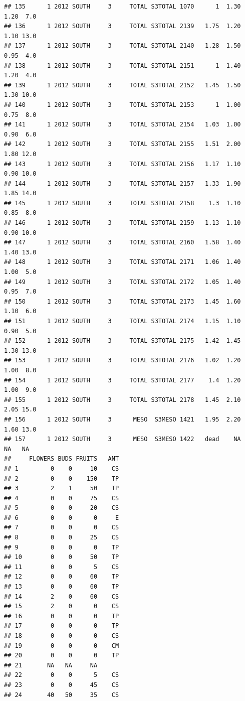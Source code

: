 \documentclass[
]{article}
\begin{document}
\begin{verbatim}
## 135      1 2012 SOUTH     3     TOTAL S3TOTAL 1070      1  1.30  1.20  7.0
## 136      1 2012 SOUTH     3     TOTAL S3TOTAL 2139   1.75  1.20  1.10 13.0
## 137      1 2012 SOUTH     3     TOTAL S3TOTAL 2140   1.28  1.50  0.95  4.0
## 138      1 2012 SOUTH     3     TOTAL S3TOTAL 2151      1  1.40  1.20  4.0
## 139      1 2012 SOUTH     3     TOTAL S3TOTAL 2152   1.45  1.50  1.30 10.0
## 140      1 2012 SOUTH     3     TOTAL S3TOTAL 2153      1  1.00  0.75  8.0
## 141      1 2012 SOUTH     3     TOTAL S3TOTAL 2154   1.03  1.00  0.90  6.0
## 142      1 2012 SOUTH     3     TOTAL S3TOTAL 2155   1.51  2.00  1.80 12.0
## 143      1 2012 SOUTH     3     TOTAL S3TOTAL 2156   1.17  1.10  0.90 10.0
## 144      1 2012 SOUTH     3     TOTAL S3TOTAL 2157   1.33  1.90  1.85 14.0
## 145      1 2012 SOUTH     3     TOTAL S3TOTAL 2158    1.3  1.10  0.85  8.0
## 146      1 2012 SOUTH     3     TOTAL S3TOTAL 2159   1.13  1.10  0.90 10.0
## 147      1 2012 SOUTH     3     TOTAL S3TOTAL 2160   1.58  1.40  1.40 13.0
## 148      1 2012 SOUTH     3     TOTAL S3TOTAL 2171   1.06  1.40  1.00  5.0
## 149      1 2012 SOUTH     3     TOTAL S3TOTAL 2172   1.05  1.40  0.95  7.0
## 150      1 2012 SOUTH     3     TOTAL S3TOTAL 2173   1.45  1.60  1.10  6.0
## 151      1 2012 SOUTH     3     TOTAL S3TOTAL 2174   1.15  1.10  0.90  5.0
## 152      1 2012 SOUTH     3     TOTAL S3TOTAL 2175   1.42  1.45  1.30 13.0
## 153      1 2012 SOUTH     3     TOTAL S3TOTAL 2176   1.02  1.20  1.00  8.0
## 154      1 2012 SOUTH     3     TOTAL S3TOTAL 2177    1.4  1.20  1.00  9.0
## 155      1 2012 SOUTH     3     TOTAL S3TOTAL 2178   1.45  2.10  2.05 15.0
## 156      1 2012 SOUTH     3      MESO  S3MESO 1421   1.95  2.20  1.60 13.0
## 157      1 2012 SOUTH     3      MESO  S3MESO 1422   dead    NA    NA   NA
##     FLOWERS BUDS FRUITS   ANT
## 1         0    0     10    CS
## 2         0    0    150    TP
## 3         2    1     50    TP
## 4         0    0     75    CS
## 5         0    0     20    CS
## 6         0    0      0     E
## 7         0    0      0    CS
## 8         0    0     25    CS
## 9         0    0      0    TP
## 10        0    0     50    TP
## 11        0    0      5    CS
## 12        0    0     60    TP
## 13        0    0     60    TP
## 14        2    0     60    CS
## 15        2    0      0    CS
## 16        0    0      0    TP
## 17        0    0      0    TP
## 18        0    0      0    CS
## 19        0    0      0    CM
## 20        0    0      0    TP
## 21       NA   NA     NA      
## 22        0    0      5    CS
## 23        0    0     45    CS
## 24       40   50     35    CS

\end{verbatim}
\end{document}
